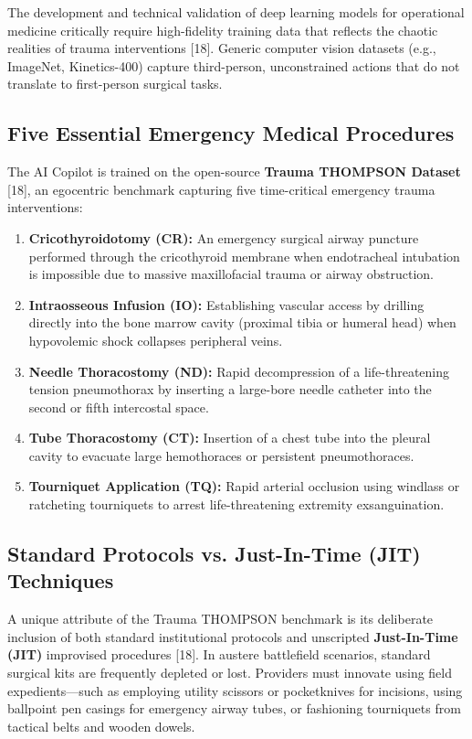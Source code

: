 \documentclass[12pt,a4paper]{report}
\begin{document}
The development and technical validation of deep learning models for operational medicine critically require high-fidelity training data that reflects the chaotic realities of trauma interventions [18]. Generic computer vision datasets (e.g., ImageNet, Kinetics-400) capture third-person, unconstrained actions that do not translate to first-person surgical tasks.

\subsection{Five Essential Emergency Medical Procedures}
The AI Copilot is trained on the open-source \textbf{Trauma THOMPSON Dataset} [18], an egocentric benchmark capturing five time-critical emergency trauma interventions:
\begin{enumerate}
    \item \textbf{Cricothyroidotomy (CR):} An emergency surgical airway puncture performed through the cricothyroid membrane when endotracheal intubation is impossible due to massive maxillofacial trauma or airway obstruction.
    \item \textbf{Intraosseous Infusion (IO):} Establishing vascular access by drilling directly into the bone marrow cavity (proximal tibia or humeral head) when hypovolemic shock collapses peripheral veins.
    \item \textbf{Needle Thoracostomy (ND):} Rapid decompression of a life-threatening tension pneumothorax by inserting a large-bore needle catheter into the second or fifth intercostal space.
    \item \textbf{Tube Thoracostomy (CT):} Insertion of a chest tube into the pleural cavity to evacuate large hemothoraces or persistent pneumothoraces.
    \item \textbf{Tourniquet Application (TQ):} Rapid arterial occlusion using windlass or ratcheting tourniquets to arrest life-threatening extremity exsanguination.
\end{enumerate}

\subsection{Standard Protocols vs. Just-In-Time (JIT) Techniques}
A unique attribute of the Trauma THOMPSON benchmark is its deliberate inclusion of both standard institutional protocols and unscripted \textbf{Just-In-Time (JIT)} improvised procedures [18]. In austere battlefield scenarios, standard surgical kits are frequently depleted or lost. Providers must innovate using field expedients---such as employing utility scissors or pocketknives for incisions, using ballpoint pen casings for emergency airway tubes, or fashioning tourniquets from tactical belts and wooden dowels. 
\end{document}
